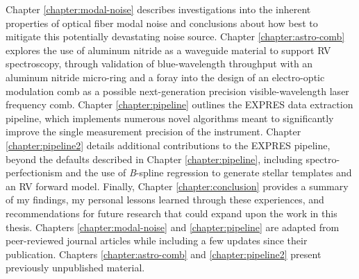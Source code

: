 Chapter \ref{chapter:modal-noise} describes investigations into the inherent properties of optical fiber modal noise and conclusions about how best to mitigate this potentially devastating noise source. Chapter \ref{chapter:astro-comb} explores the use of aluminum nitride as a waveguide material to support RV spectroscopy, through validation of blue-wavelength throughput with an aluminum nitride micro-ring and a foray into the design of an electro-optic modulation comb as a possible next-generation precision visible-wavelength laser frequency comb. Chapter \ref{chapter:pipeline} outlines the EXPRES data extraction pipeline, which implements numerous novel algorithms meant to significantly improve the single measurement precision of the instrument. Chapter \ref{chapter:pipeline2} details additional contributions to the EXPRES pipeline, beyond the defaults described in Chapter \ref{chapter:pipeline}, including spectro-perfectionism and the use of \textit{B}-spline regression to generate stellar templates and an RV forward model. Finally, Chapter \ref{chapter:conclusion} provides a summary of my findings, my personal lessons learned through these experiences, and recommendations for future research that could expand upon the work in this thesis. Chapters \ref{chapter:modal-noise} and \ref{chapter:pipeline} are adapted from peer-reviewed journal articles while including a few updates since their publication. Chapters \ref{chapter:astro-comb} and \ref{chapter:pipeline2} present previously unpublished material.
